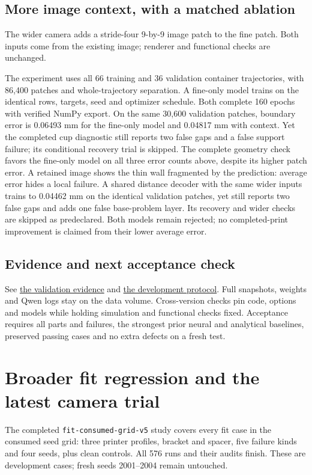 \documentclass[10pt,letterpaper]{article}
\newcommand{\repourl}{https://github.com/3D-Printing-Failure-Detection/failure-detection/blob/work/neural-local-recovery}
\newcommand{\repo}[2]{\href{\repourl/#1}{#2}}
\begin{document}
\subsection*{More image context, with a matched ablation}
The wider camera adds a stride-four 9-by-9 image patch to the fine patch. Both
inputs come from the existing image; renderer and functional checks are unchanged.

The experiment uses all 66 training and 36 validation container trajectories,
with 86,400 patches and whole-trajectory separation. A fine-only model trains on
the identical rows, targets, seed and optimizer schedule. Both complete 160
epochs with verified NumPy export. On the same 30,600 validation patches, boundary
error is 0.06493 mm for the fine-only model and 0.04817 mm with context. Yet the
completed cup diagnostic still reports two false gaps and a false support failure;
its conditional recovery trial is skipped. The complete geometry check favors the
fine-only model on all three error counts above, despite its higher patch error.
A retained image shows the thin wall fragmented by the prediction: average error
hides a local failure. A shared distance decoder with the same wider inputs trains
to 0.04462 mm on the identical validation patches, yet still reports two false
gaps and adds one false base-problem layer. Its recovery and wider checks are
skipped as predeclared. Both models remain rejected; no completed-print improvement
is claimed from their lower average error.

\subsection*{Evidence and next acceptance check}
See \repo{docs/validation/neural}{the validation evidence} and
\repo{docs/neural-recovery-plan.md}{the development protocol}. Full snapshots,
weights and Qwen logs stay on the data volume. Cross-version checks pin code,
options and models while holding simulation and functional checks fixed.
Acceptance requires all parts and failures, the strongest prior neural and
analytical baselines, preserved passing cases and no extra defects on a fresh test.

\clearpage
\section{Broader fit regression and the latest camera trial}

The completed \texttt{fit-consumed-grid-v5} study covers every fit case in the
consumed seed grid: three printer profiles, bracket and spacer, five failure
kinds and four seeds, plus clean controls. All 576 runs and their audits finish.
These are development cases; fresh seeds 2001--2004 remain untouched.
\end{document}
